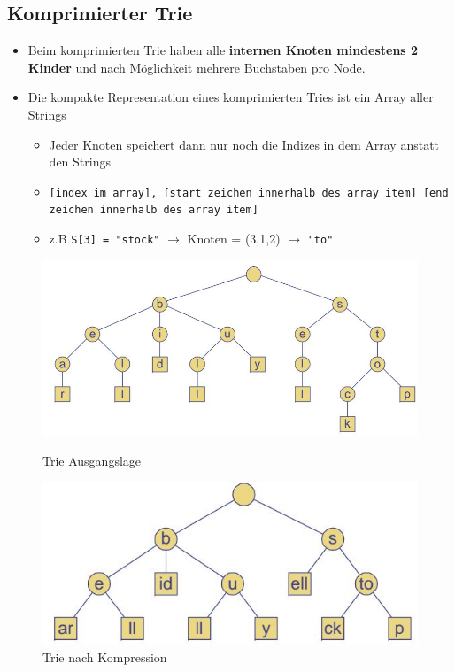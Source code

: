 \subsection{Komprimierter Trie}
\begin{itemize}
	\item Beim komprimierten Trie haben alle \textbf{internen Knoten mindestens 2 Kinder} und nach Möglichkeit mehrere Buchstaben pro Node.
	\item Die kompakte Representation eines komprimierten Tries ist ein Array aller Strings
	\begin{itemize}
		\item Jeder Knoten speichert dann nur noch die Indizes in dem Array anstatt den Strings
		\item \lstinline|[index im array], [start zeichen innerhalb des array item] [end zeichen innerhalb des array item]|
		\item z.B \lstinline|S[3] = "stock"| $\rightarrow$ Knoten = (3,1,2) $\rightarrow$ \lstinline|"to"|
	\end{itemize}
\end{itemize}
\begin{figure}[ht!]
	\centering
	\begin{minipage}[t]{0.4\textwidth}
		\centering
		\includegraphics[width=0.9\linewidth]{images/compressed_trie_init}
		\caption{Trie Ausgangslage}
		\label{fig:trieexample}
	\end{minipage}
	\begin{minipage}[t]{0.4\textwidth}
		\centering
		\includegraphics[width=0.9\linewidth]{images/compressed_trie}
		\caption{Trie nach Kompression}
		\label{fig:searchtreeinsert2}
	\end{minipage}
\end{figure}


